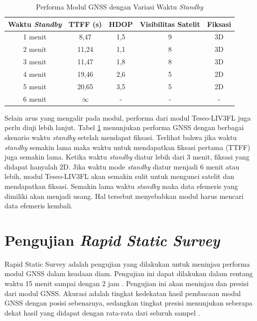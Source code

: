 \begin{table}[H]
	\caption{Performa Modul GNSS dengan Variasi Waktu \textit{Standby}}
	\vspace{0.5em}
	\centering
	\begin{tabular}{ccccc}
		\hline
		\textbf{Waktu \textit{Standby}} &\textbf{TTFF (s)} & \textbf{HDOP} & \textbf{Visibilitas Satelit} & \textbf{Fiksasi}\\
		\hline 
		1 menit & 8,47 & 1,5 & 9 & 3D\\
		2 menit & 11,24 & 1,1 & 8 & 3D\\
		3 menit & 11,47 & 1,8 & 8 & 3D\\
		4 menit & 19,46 & 2,6 & 5 & 2D\\
		5 menit & 20,65 & 3,5 & 5 & 2D\\
		6 menit & $\infty$ & - & - & -\\
		\hline
	\end{tabular}
	\label{Tab: standby-time-test}
\end{table}

Selain arus yang mengalir pada modul, performa dari modul Teseo-LIV3FL juga perlu diuji lebih lanjut. Tabel \ref{Tab: standby-time-test} menunjukan performa GNSS dengan berbagai skenario waktu \textit{standby} setelah mendapat fiksasi. Terlihat bahwa jika waktu \textit{standby} semakin lama maka waktu untuk mendapatkan fiksasi pertama (TTFF) juga semakin lama. Ketika waktu \textit{standby} diatur lebih dari 3 menit, fiksasi yang didapat hanyalah 2D. Jika waktu mode \textit{standby} diatur menjadi 6 menit atau lebih, modul Teseo-LIV3FL akan semakin sulit untuk mengunci satelit dan mendapatkan fiksasi. Semakin lama waktu \textit{standby} maka data efemeris yang dimiliki akan menjadi usang. Hal tersebut menyebabkan modul harus mencari data efemeris kembali.

\section{Pengujian \textit{Rapid Static Survey}}
Rapid Static Survey adalah pengujian yang dilakukan untuk meninjau performa modul GNSS dalam keadaan diam. Pengujian ini dapat dilakukan dalam rentang waktu 15 menit sampai dengan 2 jam \cite{lauer2019static}. Pengujian ini akan meninjau  dan presisi dari modul GNSS. Akurasi adalah tingkat kedekatan hasil pembacaan modul GNSS dengan posisi sebenarnya, sedangkan tingkat presisi menunjukan seberapa dekat hasil yang didapat dengan rata-rata dari seluruh sampel \cite{gnssca_apn029}.

